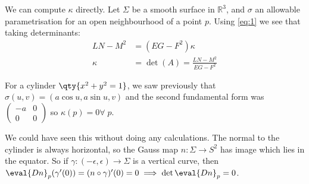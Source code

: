We can compute $\kappa$ directly.
Let $\Sigma$ be a smooth surface in $\mathbb R^3$, and $\sigma$ an allowable parametrisation for an open neighbourhood of a point $p$.
Using \cref{eq:1} we see that taking determinants:
\begin{align*}
	LN - M^2 &= (EG - F^2) \kappa \\
	\kappa &= \det(A) = \frac{LN - M^2}{EG - F^2}
\end{align*} 

\begin{example}[Cylinder]
	For a cylinder $\qty{x^2 + y^2 = 1}$, we saw previously that $\sigma(u, v) = (a\cos u, a \sin u, v)$ and the second fundamental form was $\begin{pmatrix}-a & 0 \\0 & 0\end{pmatrix}$ so $\kappa(p) = 0 \forall \; p$.

	We could have seen this without doing any calculations.
	The normal to the cylinder is always horizontal, so the Gauss map $n \colon \Sigma \to S^2$ has image which lies in the equator.
	So if $\gamma : (-\epsilon, \epsilon) \to \Sigma$ is a vertical curve, then $\eval{Dn}_p(\gamma'(0)) = (n \circ \gamma)'(0) = 0 \implies \det \eval{Dn}_p = 0$.
\end{example}

